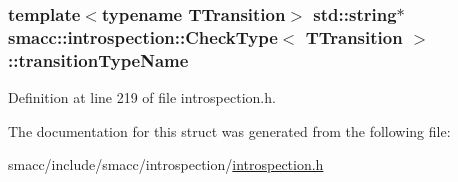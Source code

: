 \subsubsection[{\texorpdfstring{transition\+Type\+Name}{transitionTypeName}}]{\setlength{\rightskip}{0pt plus 5cm}template$<$typename T\+Transition$>$ std\+::string$\ast$ {\bf smacc\+::introspection\+::\+Check\+Type}$<$ T\+Transition $>$\+::transition\+Type\+Name}\hypertarget{structsmacc_1_1introspection_1_1CheckType_a0b356fd5975fa8f359f4e47f9ac8debf}{}\label{structsmacc_1_1introspection_1_1CheckType_a0b356fd5975fa8f359f4e47f9ac8debf}


Definition at line 219 of file introspection.\+h.



The documentation for this struct was generated from the following file\+:\begin{DoxyCompactItemize}
\item 
smacc/include/smacc/introspection/\hyperlink{introspection_8h}{introspection.\+h}\end{DoxyCompactItemize}
